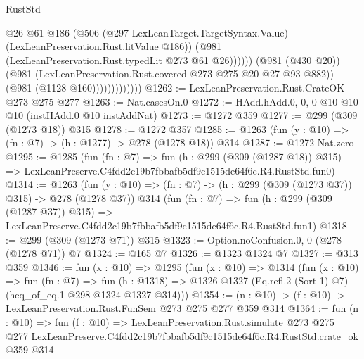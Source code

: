 \begin{lexlean}{RustStd}
\begin{coremodule}
                                  @26
                                  @61
                                  @186
                                  (@506
                                    (@297 LexLeanTarget.TargetSyntax.Value)
                                    (LexLeanPreservation.Rust.litValue @186))
                                  (@981 (LexLeanPreservation.Rust.typedLit @273 @61 @26))))))
                          (@981 (@430 @20))
                          (@981 (LexLeanPreservation.Rust.covered @273 @275 @20 @27 @93 @882))
                          (@981 (@1128 @160)))))))))))))
@1262 := LexLeanPreservation.Rust.CrateOK @273 @275 @277
@1263 := Nat.casesOn.{0}
@1272 := HAdd.hAdd.{0, 0, 0} @10 @10 @10 (instHAdd.{0} @10 instAddNat)
@1273 := @1272 @359
@1277 := @299 (@309 (@1273 @18)) @315
@1278 := @1272 @357
@1285 := @1263 (fun (y : @10) => (fn : @7) -> (h : @1277) -> @278 (@1278 @18)) @314
@1287 := @1272 Nat.zero
@1295 := @1285
    (fun (fn : @7) =>
    fun (h : @299 (@309 (@1287 @18)) @315) =>
    LexLeanPreserve.C4fdd2c19b7fbbafb5df9c1515de64f6c.R4.RustStd.fun0)
@1314 := @1263
    (fun (y : @10) => (fn : @7) -> (h : @299 (@309 (@1273 @37)) @315) -> @278 (@1278 @37))
    @314
    (fun (fn : @7) =>
    fun (h : @299 (@309 (@1287 @37)) @315) =>
    LexLeanPreserve.C4fdd2c19b7fbbafb5df9c1515de64f6c.R4.RustStd.fun1)
@1318 := @299 (@309 (@1273 @71)) @315
@1323 := Option.noConfusion.{0, 0} (@278 (@1278 @71)) @7
@1324 := @165 @7
@1326 := @1323 @1324 @7
@1327 := @313 @359
@1346 := fun (x : @10) =>
  @1295
    (fun (x : @10) =>
    @1314
      (fun (x : @10) =>
      fun (fn : @7) =>
      fun (h : @1318) =>
      @1326 @1327 (Eq.refl.{2} (Sort 1) @7) (heq_of_eq.{1} @298 @1324 @1327 @314)))
@1354 := (n : @10) -> (f : @10) -> LexLeanPreservation.Rust.FunSem @273 @275 @277 @359 @314
@1364 := fun (n : @10) =>
  fun (f : @10) =>
  LexLeanPreservation.Rust.simulate
    @273
    @275
    @277
    LexLeanPreserve.C4fdd2c19b7fbbafb5df9c1515de64f6c.R4.RustStd.crate_ok
    @359
    @314
\end{coremodule}
\end{lexlean}
